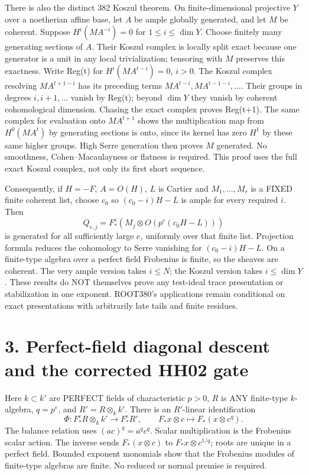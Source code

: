 \documentclass[11pt]{article}
\begin{document}
There is also the distinct 382 Koszul theorem. On finite-dimensional projective \(Y\) over a noetherian affine base, let \(A\) be ample globally generated, and let \(M\) be coherent. Suppose \(H^i(MA^{-i})=0\) for \(1\le i\le\dim Y\). Choose finitely many generating sections of \(A\). Their Koszul complex is locally split exact because one generator is a unit in any local trivialization; tensoring with \(M\) preserves this exactness. Write Reg(t) for \(H^i(MA^{t-i})=0\), \(i>0\). The Koszul complex resolving \(MA^{t+1-i}\) has its preceding terms \(MA^{t-i},MA^{t-1-i},\ldots\). Their groups in degrees \(i,i+1,\ldots\) vanish by Reg(t); beyond \(\dim Y\) they vanish by coherent cohomological dimension. Chasing the exact complex proves Reg(t+1). The same complex for evaluation onto \(MA^{t+1}\) shows the multiplication map from \(H^0(MA^t)\) by generating sections is onto, since its kernel has zero \(H^1\) by these same higher groups. High Serre generation then proves \(M\) generated. No smoothness, Cohen--Macaulayness or flatness is required. This proof uses the full exact Koszul complex, not only its first short sequence.

Consequently, if \(H=-F\), \(A=O(H)\), \(L\) is Cartier and \(M_1,\ldots,M_r\) is a FIXED finite coherent list, choose \(c_0\) so \((c_0-i)H-L\) is ample for every required \(i\). Then
\[
Q_{e,j}=F_*^e(M_j\otimes O(p^e(c_0H-L)))
\]
is generated for all sufficiently large \(e\), uniformly over that finite list. Projection formula reduces the cohomology to Serre vanishing for \((c_0-i)H-L\). On a finite-type algebra over a perfect field Frobenius is finite, so the sheaves are coherent. The very ample version takes \(i\le N\); the Koszul version takes \(i\le\dim Y\). These results do NOT themselves prove any test-ideal trace presentation or stabilization in one exponent. ROOT380's applications remain conditional on exact presentations with arbitrarily late tails and finite residues.

\section{3. Perfect-field diagonal descent and the corrected HH02 gate}

Here \(k\subset k'\) are PERFECT fields of characteristic \(p>0\), \(R\) is ANY finite-type \(k\)-algebra, \(q=p^e\), and \(R'=R\otimes_k k'\). There is an \(R'\)-linear identification
\[
\Phi:F_*^eR\otimes_k k'\longrightarrow F_*^eR',\qquad
F_*x\otimes c\longmapsto F_*(x\otimes c^q).
\]
The balance relation uses \((ac)^q=a^qc^q\). Scalar multiplication is the Frobenius scalar action. The inverse sends \(F_*(x\otimes c)\) to \(F_*x\otimes c^{1/q}\); roots are unique in a perfect field. Bounded exponent monomials show that the Frobenius modules of finite-type algebras are finite. No reduced or normal premise is required.
\end{document}
